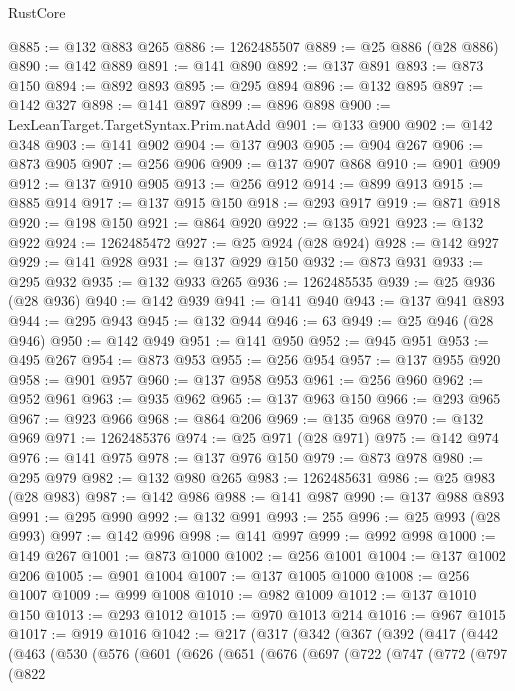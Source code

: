 \begin{lexlean}{RustCore}
\begin{coremodule}
@885 := @132 @883 @265
@886 := 1262485507
@889 := @25 @886 (@28 @886)
@890 := @142 @889
@891 := @141 @890
@892 := @137 @891
@893 := @873 @150
@894 := @892 @893
@895 := @295 @894
@896 := @132 @895
@897 := @142 @327
@898 := @141 @897
@899 := @896 @898
@900 := LexLeanTarget.TargetSyntax.Prim.natAdd
@901 := @133 @900
@902 := @142 @348
@903 := @141 @902
@904 := @137 @903
@905 := @904 @267
@906 := @873 @905
@907 := @256 @906
@909 := @137 @907 @868
@910 := @901 @909
@912 := @137 @910 @905
@913 := @256 @912
@914 := @899 @913
@915 := @885 @914
@917 := @137 @915 @150
@918 := @293 @917
@919 := @871 @918
@920 := @198 @150
@921 := @864 @920
@922 := @135 @921
@923 := @132 @922
@924 := 1262485472
@927 := @25 @924 (@28 @924)
@928 := @142 @927
@929 := @141 @928
@931 := @137 @929 @150
@932 := @873 @931
@933 := @295 @932
@935 := @132 @933 @265
@936 := 1262485535
@939 := @25 @936 (@28 @936)
@940 := @142 @939
@941 := @141 @940
@943 := @137 @941 @893
@944 := @295 @943
@945 := @132 @944
@946 := 63
@949 := @25 @946 (@28 @946)
@950 := @142 @949
@951 := @141 @950
@952 := @945 @951
@953 := @495 @267
@954 := @873 @953
@955 := @256 @954
@957 := @137 @955 @920
@958 := @901 @957
@960 := @137 @958 @953
@961 := @256 @960
@962 := @952 @961
@963 := @935 @962
@965 := @137 @963 @150
@966 := @293 @965
@967 := @923 @966
@968 := @864 @206
@969 := @135 @968
@970 := @132 @969
@971 := 1262485376
@974 := @25 @971 (@28 @971)
@975 := @142 @974
@976 := @141 @975
@978 := @137 @976 @150
@979 := @873 @978
@980 := @295 @979
@982 := @132 @980 @265
@983 := 1262485631
@986 := @25 @983 (@28 @983)
@987 := @142 @986
@988 := @141 @987
@990 := @137 @988 @893
@991 := @295 @990
@992 := @132 @991
@993 := 255
@996 := @25 @993 (@28 @993)
@997 := @142 @996
@998 := @141 @997
@999 := @992 @998
@1000 := @149 @267
@1001 := @873 @1000
@1002 := @256 @1001
@1004 := @137 @1002 @206
@1005 := @901 @1004
@1007 := @137 @1005 @1000
@1008 := @256 @1007
@1009 := @999 @1008
@1010 := @982 @1009
@1012 := @137 @1010 @150
@1013 := @293 @1012
@1015 := @970 @1013 @214
@1016 := @967 @1015
@1017 := @919 @1016
@1042 := @217
    (@317
      (@342
        (@367
          (@392
            (@417
              (@442
                (@463
                  (@530
                    (@576
                      (@601
                        (@626
                          (@651
                            (@676
                              (@697
                                (@722
                                  (@747
                                    (@772
                                      (@797
                                        (@822

\end{coremodule}
\end{lexlean}
